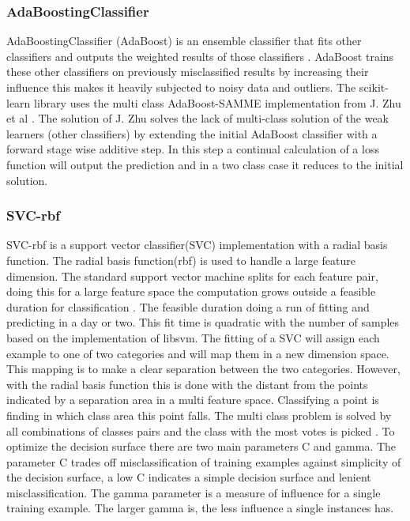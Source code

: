 \documentclass[a4paper,10pt]{article}
\begin{document}
\subsubsection{AdaBoostingClassifier}
AdaBoostingClassifier (AdaBoost) is an ensemble classifier that fits other classifiers and outputs the weighted results of those classifiers \cite{AdaBoost}. AdaBoost trains these other classifiers on previously misclassified results by increasing their influence this makes it heavily subjected to noisy data and outliers. The scikit-learn library uses the multi class AdaBoost-SAMME implementation from J. Zhu et al \cite{MadaB}. The solution of J. Zhu solves the lack of multi-class solution of the weak learners (other classifiers) by extending the initial AdaBoost classifier with a forward stage wise additive step. In this step a continual calculation of a loss function will output the prediction and in a two class case it reduces to the initial solution.

\subsubsection{SVC-rbf}
SVC-rbf is a support vector classifier(SVC) implementation with a radial basis function. The radial basis function(rbf) is used to handle a large feature dimension. The standard support vector machine splits for each feature pair, doing this for a large feature space the computation grows outside a feasible duration for classification \cite{SVN}. The feasible duration doing a run of fitting and predicting in a day or two. This fit time is quadratic with the number of samples based on the implementation of libsvm\cite{SVM}. The fitting of a SVC will assign each example to one of two categories and will map them in a new dimension space. This mapping is to make a clear separation between the two categories. However, with the radial basis function this is done with the distant from the points indicated by a separation area in a multi feature space. Classifying a point is finding in which class area this point falls. The multi class problem is solved by  all combinations of classes pairs and the class with the most votes is picked \cite{Multi-pair-coup}. To optimize the decision surface there are two main parameters C and gamma. The parameter C trades off misclassification of training examples against simplicity of the decision surface, a low C indicates a simple decision surface and lenient misclassification. The gamma parameter is a measure of influence for a single training example. The larger gamma is, the less influence a single instances has.
\end{document}
